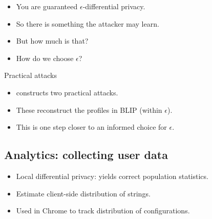 \begin{frame}
  \begin{question}
    \begin{itemize}
      \item You are guaranteed \(\epsilon\)-differential privacy.
      \item So there is something the attacker may learn.
      \item But how much is that?
      \item How do we choose \(\epsilon\)?
    \end{itemize}
  \end{question}
\end{frame}

\begin{frame}
  \begin{block}{Practical attacks}
    \begin{itemize}
      \item \citet{ChallengingDiffPriv} constructs two practical attacks.
      \item These reconstruct the profiles in BLIP (within \(\epsilon\)).

        \pause

      \item This is one step closer to an informed choice for \(\epsilon\).
    \end{itemize}
  \end{block}
\end{frame}

\subsection{Analytics: collecting user data}

\begin{frame}
  \begin{example}
    \begin{itemize}
      \item Local differential privacy: yields correct population statistics.
      \item Estimate client-side distribution of strings.
      \item Used in Chrome to track distribution of configurations.
    \end{itemize}
  \end{example}
\end{frame}

